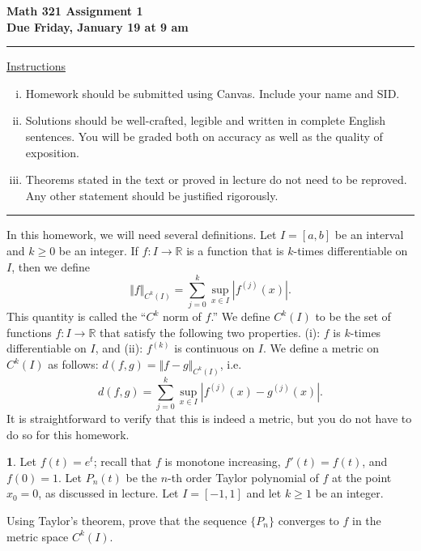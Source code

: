 \documentclass[12pt]{article}
\newcommand{\RR}{\mathbb{R}}
\theoremstyle{definition}
\newtheorem{problem}{}
\begin{document}
\fancyhf{} %
\renewcommand{\headrulewidth}{0pt}


\begin{center} 
{\bf{Math 321 Assignment 1}} \\ 
{\bf{Due Friday, January 19 at 9 am}} 
\end{center}  
\bigskip
\hrule
\begin{center}
{\underline{Instructions}} 
\end{center} 
\begin{enumerate}[(i)] 
\item Homework should be submitted using Canvas. Include your name and SID.
%
\item Solutions should be well-crafted, legible and written in complete English sentences. You will be graded both on accuracy as well as the quality of exposition.
%
\item Theorems stated in the text or proved in lecture do not need to be reproved. Any other statement should be justified rigorously.
% 
\end{enumerate} 
\hrule
\bigskip

In this homework, we will need several definitions. Let $I=[a,b]$ be an interval and $k\geq 0$ be an integer. If $f\colon I\to\RR$ is a function that is $k$-times differentiable on $I$, then we define
\[
\Vert f \Vert_{C^k(I)}=\sum_{j=0}^k \sup_{x\in I} |f^{(j)}(x)|.
\]
This quantity is called the ``$C^k$ norm of $f$.'' We define $C^k(I)$ to be the set of functions $f\colon I\to\RR$ that satisfy the following two properties. (i): $f$ is $k$-times differentiable on $I$, and (ii): $f^{(k)}$ is continuous on $I$. We define a metric on $C^k(I)$ as follows: $d(f,g)=\Vert f-g \Vert_{C^k(I)}$, i.e.
\begin{equation}\label{CkNorm}
d(f,g) = \sum_{j=0}^k \sup_{x\in I} |f^{(j)}(x)-g^{(j)}(x)|.
\end{equation}
It is straightforward to verify that this is indeed a metric, but you do not have to do so for this homework.




\begin{problem}
Let $f(t) = e^t$; recall that $f$ is monotone increasing, $f'(t) = f(t)$, and $f(0)=1$. Let $P_n(t)$ be the $n$-th order Taylor polynomial of $f$ at the point $x_0=0$, as discussed in lecture. Let $I=[-1,1]$ and let $k\geq 1$ be an integer. 

Using Taylor's theorem, prove that the sequence $\{P_n\}$ converges to $f$ in the metric space $C^k(I)$. 
\end{problem}
\end{document}
